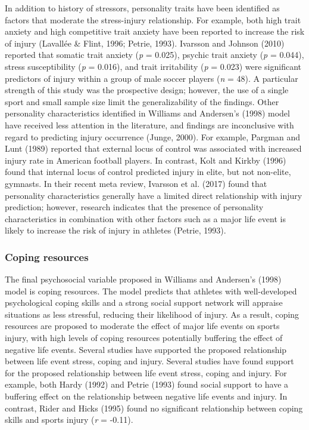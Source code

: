 \documentclass[man,floatsintext]{apa6}
\begin{document}
In addition to history of stressors, personality traits have been identified as factors that moderate the stress-injury relationship.
For example, both high trait anxiety and high competitive trait anxiety have been reported to increase the risk of injury (Lavallée \& Flint, 1996; Petrie, 1993).
Ivarsson and Johnson (2010) reported that somatic trait anxiety (\emph{p} = 0.025), psychic trait anxiety (\emph{p} = 0.044), stress susceptibility (\emph{p} = 0.016), and trait irritability (\emph{p} = 0.023) were significant predictors of injury within a group of male soccer players (\emph{n} = 48).
A particular strength of this study was the prospective design; however, the use of a single sport and small sample size limit the generalizability of the findings.
Other personality characteristics identified in Williams and Andersen's (1998) model have received less attention in the literature, and findings are inconclusive with regard to predicting injury occurrence (Junge, 2000).
For example, Pargman and Lunt (1989) reported that external locus of control was associated with increased injury rate in American football players.
In contrast, Kolt and Kirkby (1996) found that internal locus of control predicted injury in elite, but not non-elite, gymnasts.
In their recent meta review, Ivarsson et al. (2017) found that personality characteristics generally have a limited direct relationship with injury prediction; however, research indicates that the presence of personality characteristics in combination with other factors such as a major life event is likely to increase the risk of injury in athletes (Petrie, 1993).

\hypertarget{coping-resources}{%
\subsubsection{Coping resources}\label{coping-resources}}

The final psychosocial variable proposed in Williams and Andersen's (1998) model is coping resources.
The model predicts that athletes with well-developed psychological coping skills and a strong social support network will appraise situations as less stressful, reducing their likelihood of injury.
As a result, coping resources are proposed to moderate the effect of major life events on sports injury, with high levels of coping resources potentially buffering the effect of negative life events.
Several studies have supported the proposed relationship between life event stress, coping and injury.
Several studies have found support for the proposed relationship between life event stress, coping and injury. For example, both Hardy (1992) and Petrie (1993) found social support to have a buffering effect on the relationship between negative life events and injury.
In contrast, Rider and Hicks (1995) found no significant relationship between coping skills and sports injury (\emph{r} = -0.11).
\end{document}
